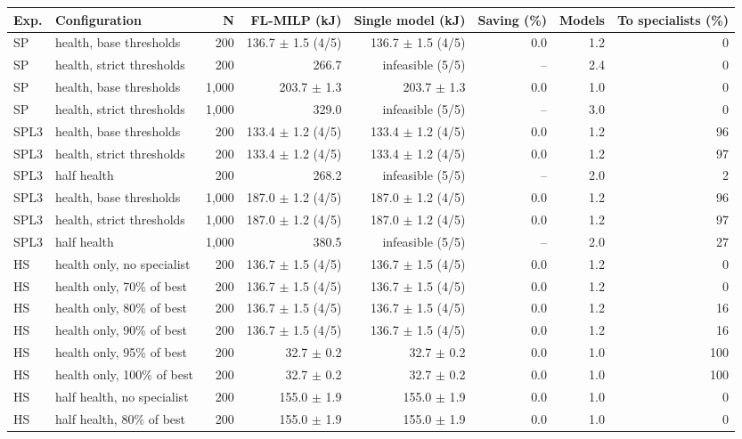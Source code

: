 \begin{tabular}{llrrrrrr}
\toprule
Exp. & Configuration & N & FL-MILP (kJ) & Single model (kJ) & Saving (\%) & Models & To specialists (\%) \\
\midrule
SP & health, base thresholds & 200 & 136.7 $\pm$ 1.5 (4/5) & 136.7 $\pm$ 1.5 (4/5) & 0.0 & 1.2 & 0 \\
SP & health, strict thresholds & 200 & 266.7 & infeasible (5/5) & – & 2.4 & 0 \\
SP & health, base thresholds & 1,000 & 203.7 $\pm$ 1.3 & 203.7 $\pm$ 1.3 & 0.0 & 1.0 & 0 \\
SP & health, strict thresholds & 1,000 & 329.0 & infeasible (5/5) & – & 3.0 & 0 \\
SPL3 & health, base thresholds & 200 & 133.4 $\pm$ 1.2 (4/5) & 133.4 $\pm$ 1.2 (4/5) & 0.0 & 1.2 & 96 \\
SPL3 & health, strict thresholds & 200 & 133.4 $\pm$ 1.2 (4/5) & 133.4 $\pm$ 1.2 (4/5) & 0.0 & 1.2 & 97 \\
SPL3 & half health & 200 & 268.2 & infeasible (5/5) & – & 2.0 & 2 \\
SPL3 & health, base thresholds & 1,000 & 187.0 $\pm$ 1.2 (4/5) & 187.0 $\pm$ 1.2 (4/5) & 0.0 & 1.2 & 96 \\
SPL3 & health, strict thresholds & 1,000 & 187.0 $\pm$ 1.2 (4/5) & 187.0 $\pm$ 1.2 (4/5) & 0.0 & 1.2 & 97 \\
SPL3 & half health & 1,000 & 380.5 & infeasible (5/5) & – & 2.0 & 27 \\
HS & health only, no specialist & 200 & 136.7 $\pm$ 1.5 (4/5) & 136.7 $\pm$ 1.5 (4/5) & 0.0 & 1.2 & 0 \\
HS & health only, 70\% of best & 200 & 136.7 $\pm$ 1.5 (4/5) & 136.7 $\pm$ 1.5 (4/5) & 0.0 & 1.2 & 0 \\
HS & health only, 80\% of best & 200 & 136.7 $\pm$ 1.5 (4/5) & 136.7 $\pm$ 1.5 (4/5) & 0.0 & 1.2 & 16 \\
HS & health only, 90\% of best & 200 & 136.7 $\pm$ 1.5 (4/5) & 136.7 $\pm$ 1.5 (4/5) & 0.0 & 1.2 & 16 \\
HS & health only, 95\% of best & 200 & 32.7 $\pm$ 0.2 & 32.7 $\pm$ 0.2 & 0.0 & 1.0 & 100 \\
HS & health only, 100\% of best & 200 & 32.7 $\pm$ 0.2 & 32.7 $\pm$ 0.2 & 0.0 & 1.0 & 100 \\
HS & half health, no specialist & 200 & 155.0 $\pm$ 1.9 & 155.0 $\pm$ 1.9 & 0.0 & 1.0 & 0 \\
HS & half health, 80\% of best & 200 & 155.0 $\pm$ 1.9 & 155.0 $\pm$ 1.9 & 0.0 & 1.0 & 0 \\

\end{tabular}
